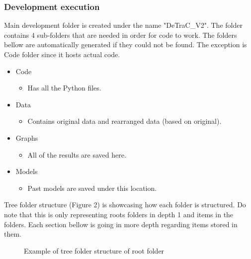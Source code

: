 \subsubsection{Development execution}

Main development folder is created under the name "DeTraC{\_}V2". The folder contains 4 sub-folders that are needed in order for code to work. 
\newline
The folders bellow are automatically generated if they could not be found. The exception is Code folder since it hosts actual code.
\begin{itemize}
  \item Code
    \begin{itemize}
        \item Has all the Python files.
    \end{itemize}
  \item Data
    \begin{itemize}
        \item Contains original data and rearranged data (based on original).
    \end{itemize}
  \item Graphs
    \begin{itemize}
        \item All of the results are saved here.
    \end{itemize}
  \item Models
    \begin{itemize}
        \item Past models are saved under this location.
    \end{itemize}
\end{itemize}

Tree folder structure (Figure 2) is showcasing how each folder is structured. Do note that this is only representing roots folders in depth 1 and items in the folders. Each section bellow is going in more depth regarding items stored in them.
\begin{figure}[!ht]
\caption{Example of tree folder structure of root folder}
\end{figure}

